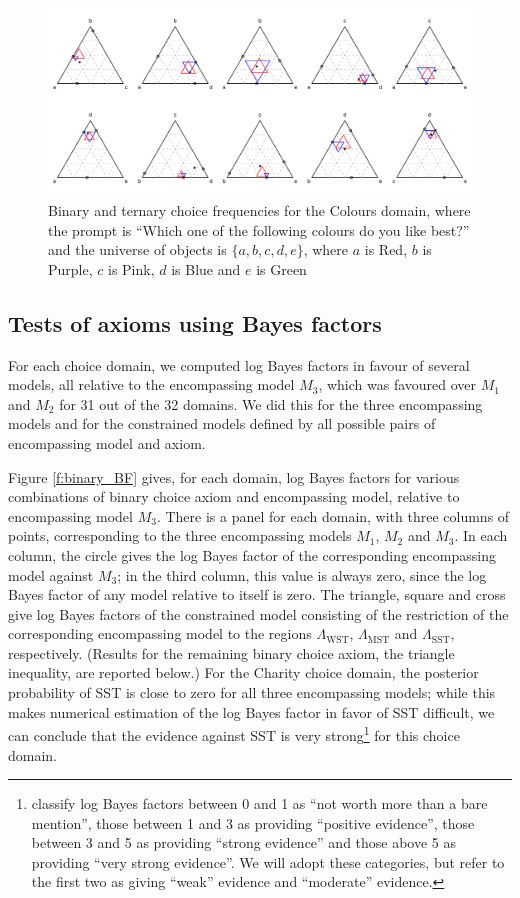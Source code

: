 \documentclass[11pt,letter]{article}
\begin{document}
\begin{figure}
	\caption{Binary and ternary choice frequencies for the Colours domain, where the prompt is ``Which one of the following colours do you like best?'' and the universe of objects is $\{a,b,c,d,e\}$, where $a$ is Red, $b$ is Purple, $c$ is Pink, $d$ is Blue and $e$ is Green}\label{f:colours}
	\centering
	\includegraphics[width=16cm]{./Population_study_data/Simplexes/Colours.pdf}
\end{figure}

\subsection{Tests of axioms using Bayes factors}

For each choice domain, we computed log Bayes factors in favour of several models, all relative to the encompassing model $M_3$, which was favoured over $M_1$ and $M_2$ for 31 out of the 32 domains.
We did this for the three encompassing models and for the constrained models defined by all possible pairs of encompassing model and axiom.

Figure \ref{f:binary_BF} gives, for each domain, log Bayes factors for various combinations of binary choice axiom and encompassing model, relative to encompassing model $M_3$.
There is a panel for each domain, with three columns of points, corresponding to the three encompassing models $M_1$, $M_2$ and $M_3$.
In each column, the circle gives the log Bayes factor of the corresponding encompassing model against $M_3$; in the third column, this value is always zero, since the log Bayes factor of any model relative to itself is zero.
The triangle, square and cross give log Bayes factors of the constrained model consisting of the restriction of the corresponding encompassing model to the regions $\Lambda_{\mathrm{WST}}$, $\Lambda_{\mathrm{MST}}$ and $\Lambda_{\mathrm{SST}}$, respectively.
(Results for the remaining binary choice axiom, the triangle inequality, are reported below.)
For the Charity choice domain, the posterior probability of SST is close to zero for all three encompassing models; while this makes numerical estimation of the log Bayes factor in favor of SST difficult, we can conclude that the evidence against SST is very strong\footnote{ classify log Bayes factors between 0 and 1 as ``not worth more than a bare mention'', those between 1 and 3 as providing ``positive evidence'', those between 3 and 5 as providing ``strong evidence'' and those above 5 as providing ``very strong evidence''. We will adopt these categories, but refer to the first two as giving ``weak'' evidence and ``moderate'' evidence.} for this choice domain.
\end{document}

